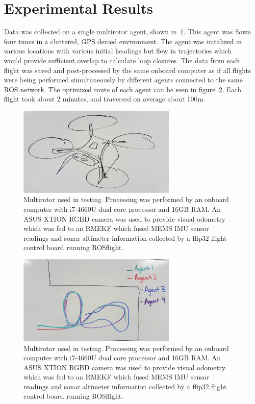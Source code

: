
\section{Experimental Results}

Data was collected on a single multirotor agent, shown in~\ref{fig:leo_hardware}.  This agent was flown four times in a cluttered, GPS denied environment.  The agent was initalized in various locations with various initial headings but flew in trajectories which would provide sufficient overlap to calculate loop closures.  The data from each flight was saved and post-processed by the same onboard computer as if all flights were being performed simultaneously by different agents connected to the same ROS network.  The optimized route of each agent can be seen in figure~\ref{fig:hardware_results}.  Each flight took about 2 minutes, and traversed on average about 100m.

\begin{figure}[H]
  \includegraphics[width=0.7\textwidth]{figures/leo.jpg}
  \caption{Multirotor used in testing.  Processing was performed by an onboard computer with i7-4660U dual core processor and 16GB RAM.  An ASUS XTION RGBD camera was used to provide visual odometry which was fed to an RMEKF which fused MEMS IMU sensor readings and sonar altimeter information collected by a flip32 flight control board running ROSflight.}
  \label{fig:leo_hardware}
\end{figure}


\begin{figure}[H]
  \includegraphics[width=0.7\textwidth]{figures/hardware_results.jpg}
  \caption{Multirotor used in testing.  Processing was performed by an onboard computer with i7-4660U dual core processor and 16GB RAM.  An ASUS XTION RGBD camera was used to provide visual odometry which was fed to an RMEKF which fused MEMS IMU sensor readings and sonar altimeter information collected by a flip32 flight control board running ROSflight.}
  \label{fig:hardware_results}
\end{figure}

